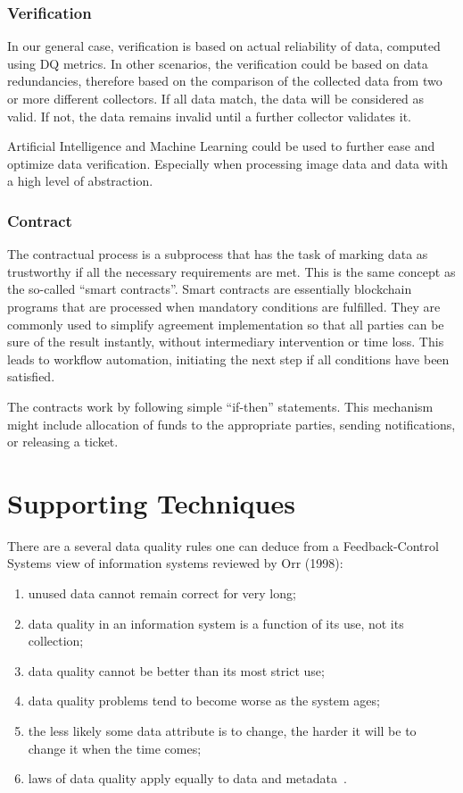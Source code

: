 \subsubsection{Verification}

In our general case, verification is based on actual reliability of data, computed using DQ metrics.
In other scenarios, the verification could be based on data redundancies, therefore based on the comparison of the collected data from two or more different collectors.
If all data match, the data will be considered as valid.
If not, the data remains invalid until a further collector validates it.

Artificial Intelligence and Machine Learning could be used to further ease and optimize data verification.
Especially when processing image data and data with a high level of abstraction.

\subsubsection{Contract}

The contractual process is a subprocess that has the task of marking data as trustworthy if all the necessary requirements are met.
This is the same concept as the so-called \enquote{smart contracts}.
Smart contracts are essentially blockchain programs that are processed when mandatory conditions are fulfilled.
They are commonly used to simplify agreement implementation so that all parties can be sure of the result instantly, without intermediary intervention or time loss.
This leads to workflow automation, initiating the next step if all conditions have been satisfied.

The contracts work by following simple \enquote{if-then} statements.
This mechanism might include allocation of funds to the appropriate parties, sending notifications, or releasing a ticket.

\section{Supporting Techniques}

There are a several data quality rules one can deduce from a Feedback-Control Systems view of information systems reviewed by Orr (1998):
\begin{enumerate}
    \item unused data cannot remain correct for very long;
    \item data quality in an information system is a function of its use, not its collection;
    \item data quality cannot be better than its most strict use;
    \item data quality problems tend to become worse as the system ages;
    \item the less likely some data attribute is to change, the harder it will be to change it when the time comes;
    \item laws of data quality apply equally to data and metadata~\cite{orr1998}.
\end{enumerate}

